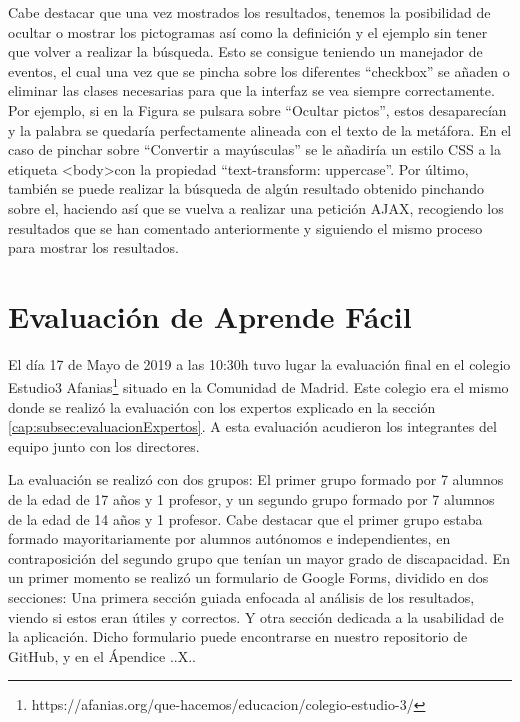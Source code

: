 Cabe destacar que una vez mostrados los resultados, tenemos la posibilidad de ocultar o mostrar los pictogramas así como la definición y el ejemplo sin tener que volver a realizar la búsqueda. Esto se consigue teniendo un manejador de eventos, el cual una vez que se pincha sobre los diferentes ``checkbox'' se añaden o eliminar las clases necesarias para que la interfaz se vea siempre correctamente. Por ejemplo, si en la Figura se pulsara sobre ``Ocultar pictos'', estos desaparecían y la palabra se quedaría perfectamente alineada con el texto de la metáfora. En el caso de pinchar sobre ``Convertir a mayúsculas'' se le añadiría un estilo CSS a la etiqueta <body>con la propiedad ``text-transform: uppercase''.
Por último, también se puede realizar la búsqueda de algún resultado obtenido pinchando sobre el, haciendo así que se vuelva a realizar una petición AJAX, recogiendo los resultados que se han comentado anteriormente y siguiendo el mismo proceso para mostrar los resultados.

\section{Evaluación de Aprende Fácil}

El día 17 de Mayo de 2019 a las 10:30h tuvo lugar la evaluación final en el colegio Estudio3 Afanias\footnote{https://afanias.org/que-hacemos/educacion/colegio-estudio-3/} situado en la Comunidad de Madrid. Este colegio era el mismo donde se realizó la evaluación con los expertos explicado en la sección \ref{cap:subsec:evaluacionExpertos}. A esta evaluación acudieron los integrantes del equipo junto con los directores.

La evaluación se realizó con dos grupos: El primer grupo formado por 7 alumnos de la edad de 17 años y 1 profesor, y un segundo grupo formado por 7 alumnos de la edad de 14 años y 1 profesor.
Cabe destacar que el primer grupo estaba formado mayoritariamente por alumnos autónomos e independientes, en contraposición del segundo grupo que tenían un mayor grado de discapacidad.
En un primer momento se realizó un formulario de Google Forms, dividido en dos secciones: Una primera sección guiada enfocada al análisis de los resultados, viendo si estos eran útiles y correctos. Y otra sección dedicada a la usabilidad de la aplicación.
Dicho formulario  puede encontrarse en nuestro repositorio de GitHub, y en el Ápendice ..X..

